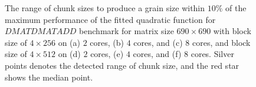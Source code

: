 \begin{figure}[H]
	\hfill
	\caption{The range of chunk sizes to produce a grain size within $10\%$ of the maximum performance of the fitted quadratic function for $DMATDMATADD$ benchmark for matrix size $690\times690$ with block size of $4\times256$ on (a) $2$ cores, (b) $4$ cores, and (c) $8$ cores, and block size of $4\times512$ on (d) $2$ cores, (e) $4$ cores, and (f) $8$ cores. Silver points denotes the detected range of chunk size, and the red star shows the median point.}	
	\label{fig14}
\end{figure}



\vspace{\baselineskip}	 